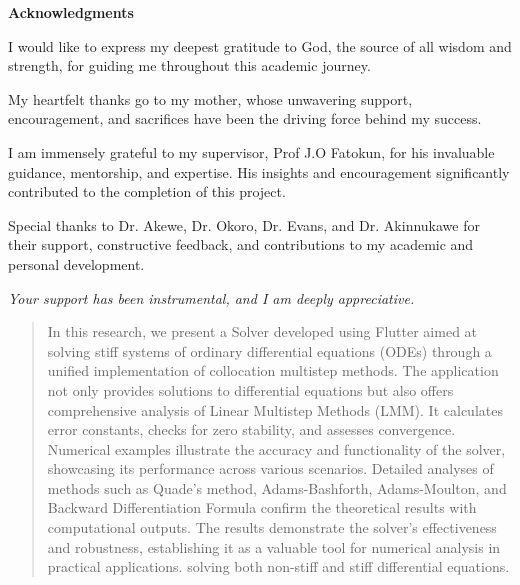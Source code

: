 \documentclass[a4paper, twoside]{report} %
\begin{document}
	\begin{titlepage}

		\vspace*{2cm}
		\begin{center}
			{\LARGE\textbf{Acknowledgments}}
		\end{center}


		\vspace{1cm}
		\large
		I would like to express my deepest gratitude to God, the source of all wisdom and strength, for guiding me throughout this academic journey.

		\vspace{0.5cm}
		My heartfelt thanks go to my mother, whose unwavering support, encouragement, and sacrifices have been the driving force behind my success.

		\vspace{0.5cm}
		I am immensely grateful to my supervisor, Prof J.O Fatokun, for his invaluable guidance, mentorship, and expertise. His insights and encouragement significantly contributed to the completion of this project.

		\vspace{0.5cm}
		Special thanks to Dr. Akewe, Dr. Okoro, Dr. Evans, and Dr. Akinnukawe for their support, constructive feedback, and contributions to my academic and personal development.

		\vspace{2cm}
		\textit{Your support has been instrumental, and I am deeply appreciative.}
	\end{titlepage}

	\begin{abstract}
		In this research, we present a Solver developed using Flutter aimed at solving stiff systems of ordinary differential equations (ODEs) through a unified implementation of collocation multistep methods. The application not only provides solutions to differential equations but also offers comprehensive analysis of Linear Multistep Methods (LMM). It calculates error constants, checks for zero stability, and assesses convergence. Numerical examples illustrate the accuracy and functionality of the solver, showcasing its performance across various scenarios. Detailed analyses of methods such as Quade’s method, Adams-Bashforth, Adams-Moulton, and Backward Differentiation Formula confirm the theoretical results with computational outputs. The results demonstrate the solver's effectiveness and robustness, establishing it as a valuable tool for numerical analysis in practical applications. solving both non-stiff and stiff differential equations.
	\end{abstract}
\end{document}
